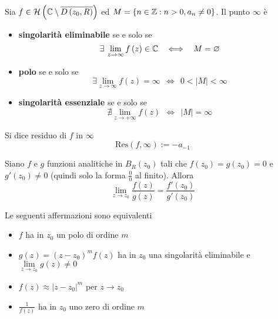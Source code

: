 \begin{thm}
Sia $f\in \mathcal{H} \left(\mathbb{C}  \setminus \overline{D\left( z_{0} ,R\right)}\right)$ ed $M=\left\{n\in \mathbb{Z}  :n >0,a_{n} \neq 0\right\}$. Il punto $\infty $ è

\begin{itemize}
\item \textbf{singolarità eliminabile} se e solo se\begin{equation*}
\exists \lim\limits _{z\rightarrow \infty } f\left( z\right) \in \CC  \ \ \iff \ \ M=\emptyset 
\end{equation*}
\item \textbf{polo} se e solo se\begin{equation*}
\exists \lim\limits _{z\rightarrow \infty } f\left( z\right) =\infty \ \ \iff \ \ 0< \left| M\right| < \infty 
\end{equation*}
\item \textbf{singolarità essenziale} se e solo se\begin{equation*}
\nexists \lim\limits _{z\rightarrow +\infty } f\left( z\right) \ \ \iff \ \ \left| M\right| =\infty 
\end{equation*}
\end{itemize}
\end{thm}
\begin{defn}
Si dice residuo di $f$ in $\infty $
\begin{equation*}
\mathrm{Res}\left( f,\infty \right) :=-a_{-1}
\end{equation*}
\end{defn}
\begin{thm}
[di De l'Hôpital] Siano $f$ e $g$ funzioni analitiche in $B_{R}\left( z_{0}\right)$ tali che $f\left( z_{0}\right) =g\left( z_{0}\right) =0$ e $g'\left( z_{0}\right) \neq 0$ (quindi solo la forma $\frac{0}{0}$ al finito). Allora
\begin{equation*}
\lim\limits _{z\rightarrow z_{0}}\frac{f\left( z\right)}{g\left( z\right)} =\frac{f'\left( z_{0}\right)}{g'\left( z_{0}\right)}
\end{equation*}
\end{thm}
\begin{thm}
Le seguenti affermazioni sono equivalenti
\begin{itemize}
\item $f$ ha in $z_{0}$ un polo di ordine $m$
\item $g\left( z\right) =\left( z-z_{0}\right)^{m} f\left( z\right)$ ha in $z_{0}$ una singolarità eliminabile e $\lim\limits _{z\rightarrow z_{0}} g\left( z\right) \neq 0$
\item $f\left( z\right) \approx \left| z-z_{0}\right| ^{m}$ per $z\rightarrow z_{0}$
\item $\frac{1}{f\left( z\right)}$ ha in $z_{0}$ uno zero di ordine $m$
\end{itemize}
\end{thm}
